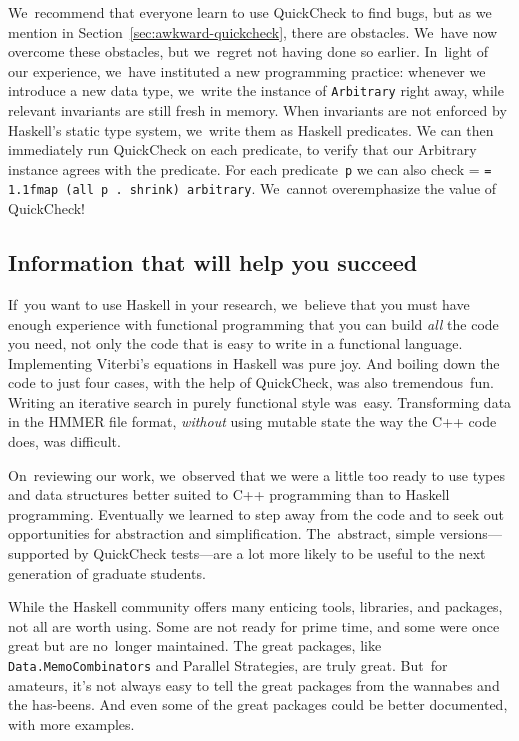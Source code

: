 \documentclass[]{jfp1}
\makeatletter
\newcommand\secref[1]{Section~\ref{sec:#1}}
\newcommand\seclabel[1]{\label{sec:#1}}
\newcommand{\mono}[1]{%
  {\@tempdima = \fontdimen2\font
   \texttt{\spaceskip = 1.1\@tempdima #1}}}
\makeatother
\begin{document}
We~recommend that everyone learn to use QuickCheck to find bugs, but
as we mention in 
\secref{awkward-quickcheck}, there are obstacles.
We~have now overcome these obstacles, but
we~regret not having done so earlier.
In~light of our experience, we~have instituted a new programming practice:
whenever we introduce a new data type,
we~write the instance of
\texttt{Arbitrary} right away, while
relevant invariants are still fresh in memory.
When invariants are not enforced by Haskell's static type system,
we~write them as Haskell predicates.
We can then immediately run QuickCheck on each predicate, to verify
that our Arbitrary instance agrees with the predicate.
For each predicate~\texttt{p} we can also check
\mono{fmap (all p . shrink) arbitrary}.
We~cannot overemphasize the value of QuickCheck!





\subsection{Information that will help you succeed}

If~you want to use Haskell in your research, we~believe that you must
have enough experience with functional programming that you can build
\emph{all} the code you need, not only the code that is easy to write
in a functional language.
Implementing Viterbi's equations in Haskell was pure joy.
And boiling down the code to just four cases, with the help of
QuickCheck, was also tremendous~fun.
Writing an iterative search in purely functional style was~easy.
Transforming data in the HMMER file format, \emph{without}
using mutable state the way the C++ code does, was difficult.

On~reviewing our work, we~observed that we were a little too ready to
use types and data structures better suited to C++ programming than to
Haskell programming.
Eventually we learned to step away from the code and to seek
out opportunities for abstraction and simplification.
The~abstract, simple versions---supported by QuickCheck tests---are a
lot more likely to be useful to the next generation of graduate students.


\seclabel{penumbra}

While the Haskell community offers many
enticing tools, libraries, and packages,
not all are worth using.
Some are not ready for prime time, and some were once great but are
no~longer maintained.
The great packages, like \texttt{Data.MemoCombinators} and Parallel
Strategies, are truly great.
But~for amateurs, it's not always easy to tell the great packages from the wannabes
and the has-beens.
And even some of the great packages could be better documented, with
more examples.
\end{document}
